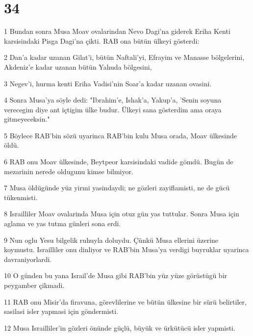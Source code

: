 \chapter{34}

\par 1 Bundan sonra Musa Moav ovalarindan Nevo Dagi'na giderek Eriha Kenti karsisindaki Pisga Dagi'na çikti. RAB ona bütün ülkeyi gösterdi:
\par 2 Dan'a kadar uzanan Gilat'i, bütün Naftali'yi, Efrayim ve Manasse bölgelerini, Akdeniz'e kadar uzanan bütün Yahuda bölgesini,
\par 3 Negev'i, hurma kenti Eriha Vadisi'nin Soar'a kadar uzanan ovasini.
\par 4 Sonra Musa'ya söyle dedi: "Ibrahim'e, Ishak'a, Yakup'a, 'Senin soyuna verecegim diye ant içtigim ülke budur. Ülkeyi sana gösterdim ama oraya gitmeyeceksin."
\par 5 Böylece RAB'bin sözü uyarinca RAB'bin kulu Musa orada, Moav ülkesinde öldü.
\par 6 RAB onu Moav ülkesinde, Beytpeor karsisindaki vadide gömdü. Bugün de mezarinin nerede oldugunu kimse bilmiyor.
\par 7 Musa öldügünde yüz yirmi yasindaydi; ne gözleri zayiflamisti, ne de gücü tükenmisti.
\par 8 Israilliler Moav ovalarinda Musa için otuz gün yas tuttular. Sonra Musa için aglama ve yas tutma günleri sona erdi.
\par 9 Nun oglu Yesu bilgelik ruhuyla doluydu. Çünkü Musa ellerini üzerine koymustu. Israilliler onu dinliyor ve RAB'bin Musa'ya verdigi buyruklar uyarinca davraniyorlardi.
\par 10 O günden bu yana Israil'de Musa gibi RAB'bin yüz yüze görüstügü bir peygamber çikmadi.
\par 11 RAB onu Misir'da firavuna, görevlilerine ve bütün ülkesine bir sürü belirtiler, sasilasi isler yapmasi için göndermisti.
\par 12 Musa Israilliler'in gözleri önünde güçlü, büyük ve ürkütücü isler yapmisti.


